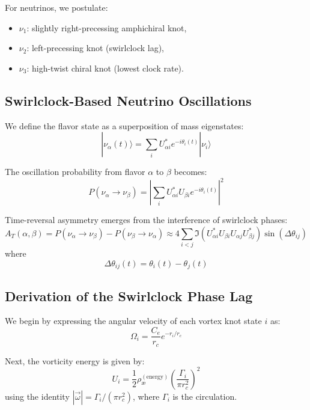 For neutrinos, we postulate:
\begin{itemize}
\item \( \nu_1 \): slightly right-precessing amphichiral knot,
\item \( \nu_2 \): left-precessing knot (swirlclock lag),
\item \( \nu_3 \): high-twist chiral knot (lowest clock rate).
\end{itemize}

\subsection{Swirlclock-Based Neutrino Oscillations}

We define the flavor state as a superposition of mass eigenstates:
\begin{equation}
|\nu_\alpha(t)\rangle = \sum_i U_{\alpha i}^* e^{-i\theta_i(t)} |\nu_i\rangle
\end{equation}

The oscillation probability from flavor \( \alpha \) to \( \beta \) becomes:
\begin{equation}
P(\nu_\alpha \rightarrow \nu_\beta) = \left| \sum_i U_{\alpha i}^* U_{\beta i} e^{-i\theta_i(t)} \right|^2
\end{equation}

Time-reversal asymmetry emerges from the interference of swirlclock phases:
\begin{equation}
A_T(\alpha, \beta) = P(\nu_\alpha \rightarrow \nu_\beta) - P(\nu_\beta \rightarrow \nu_\alpha) \approx 4 \sum_{i<j} \Im(U_{\alpha i}^* U_{\beta i} U_{\alpha j} U_{\beta j}^*) \sin(\Delta \theta_{ij})
\end{equation}
where
\begin{equation}
\Delta \theta_{ij}(t) = \theta_i(t) - \theta_j(t)
\end{equation}

\subsection{Derivation of the Swirlclock Phase Lag}

We begin by expressing the angular velocity of each vortex knot state \( i \) as:
\begin{equation}
\Omega_i = \frac{C_e}{r_c} e^{-r_i / r_c}
\end{equation}

Next, the vorticity energy is given by:
\begin{equation}
U_i = \frac{1}{2} \rho_\text{\ae}^{(\text{energy})} \left( \frac{\Gamma_i}{\pi r_c^2} \right)^2
\end{equation}
using the identity \( |\vec{\omega}| = \Gamma_i / (\pi r_c^2) \), where \( \Gamma_i \) is the circulation.

